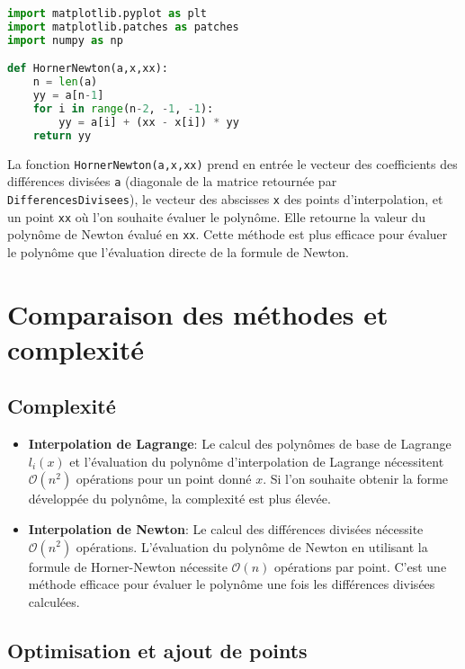 \documentclass[oneside]{book}
\begin{document}
\begin{lstlisting}[language=Python, caption=Évaluation du polynôme de Newton (Horner-Newton), label=code:horner_newton_python]
import matplotlib.pyplot as plt
import matplotlib.patches as patches
import numpy as np

def HornerNewton(a,x,xx):
    n = len(a)
    yy = a[n-1]
    for i in range(n-2, -1, -1):
        yy = a[i] + (xx - x[i]) * yy
    return yy
\end{lstlisting}

\begin{remark}
La fonction \texttt{HornerNewton(a,x,xx)} prend en entrée le vecteur des coefficients des différences divisées \texttt{a} (diagonale de la matrice retournée par \texttt{DifferencesDivisees}), le vecteur des abscisses \texttt{x} des points d'interpolation, et un point \texttt{xx} où l'on souhaite évaluer le polynôme. Elle retourne la valeur du polynôme de Newton évalué en \texttt{xx}. Cette méthode est plus efficace pour évaluer le polynôme que l'évaluation directe de la formule de Newton.
\end{remark}


\section{Comparaison des méthodes et complexité}

\subsection{Complexité}

\begin{itemize}
    \item \textbf{Interpolation de Lagrange}: Le calcul des polynômes de base de Lagrange $l_i(x)$ et l'évaluation du polynôme d'interpolation de Lagrange nécessitent $\mathcal{O}(n^2)$ opérations pour un point donné $x$. Si l'on souhaite obtenir la forme développée du polynôme, la complexité est plus élevée.
    \item \textbf{Interpolation de Newton}: Le calcul des différences divisées nécessite $\mathcal{O}(n^2)$ opérations. L'évaluation du polynôme de Newton en utilisant la formule de Horner-Newton nécessite $\mathcal{O}(n)$ opérations par point. C'est une méthode efficace pour évaluer le polynôme une fois les différences divisées calculées.
\end{itemize}

\subsection{Optimisation et ajout de points}
\end{document}
